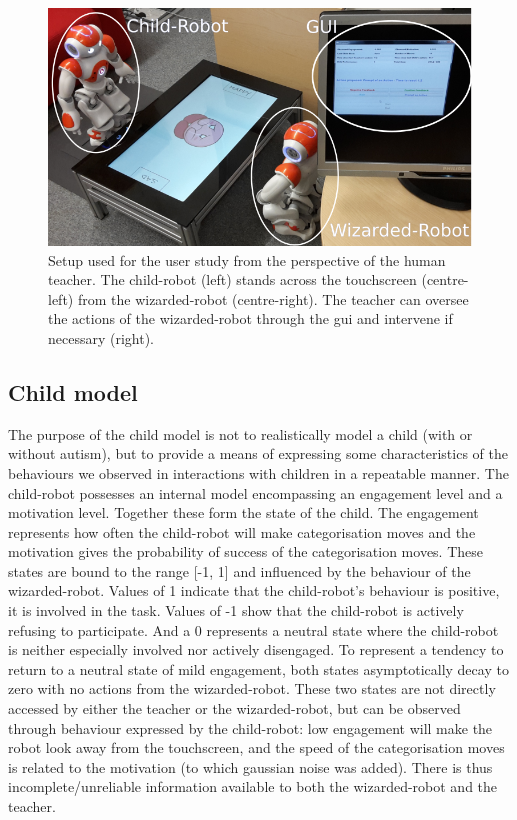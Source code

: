 \begin{figure}[ht]
	\centering
	\includegraphics[width=.9\textwidth]{setup_annotated.png}
	\caption{Setup used for the user study from the perspective of the human teacher. The child-robot (left) stands across the touchscreen (centre-left) from the wizarded-robot (centre-right). The teacher can oversee the actions of the wizarded-robot through the \gls{gui} and intervene if necessary (right).}
	\label{fig:woz_setup}
\end{figure}
		
\subsection{Child model} \label{ssec:woz_child}

The purpose of the child model is not to realistically model a child (with or without autism), but to provide a means of expressing some characteristics of the behaviours we observed in interactions with children in a repeatable manner. The child-robot possesses an internal model encompassing an engagement level and a motivation level. Together these form the state of the child. The engagement represents how often the child-robot will make categorisation moves and the motivation gives the probability of success of the categorisation moves. These states are bound to the range [-1, 1] and influenced by the behaviour of the wizarded-robot. Values of 1 indicate that the child-robot's behaviour is positive, it is involved in the task. Values of -1 show that the child-robot is actively refusing to participate. And a 0 represents a neutral state where the child-robot is neither especially involved nor actively disengaged. To represent a tendency to return to a neutral state of mild engagement, both states asymptotically decay to zero with no actions from the wizarded-robot. These two states are not directly accessed by either the teacher or the wizarded-robot, but can be observed through behaviour expressed by the child-robot: low engagement will make the robot look away from the touchscreen, and the speed of the categorisation moves is related to the motivation (to which gaussian noise was added). There is thus incomplete/unreliable information available to both the wizarded-robot and the teacher.

